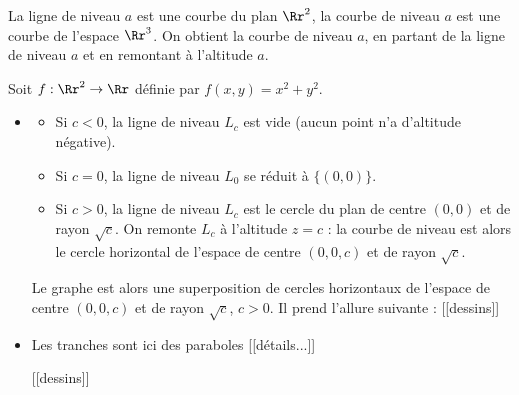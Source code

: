 \documentclass[12pt, class=report,crop=false]{standalone}
\begin{document}
La ligne de niveau $a$ est une courbe du plan $\Rr^2$, la courbe de niveau $a$
est une courbe de l'espace $\Rr^3$. On obtient la courbe de niveau $a$, en partant de la ligne de niveau $a$ et en remontant à l'altitude $a$.

\begin{exemple}
Soit $f : \Rr^2 \to \Rr$ définie par $f(x,y)=x^2+y^2$. 

\begin{itemize}
  \item
  \begin{itemize}
    \item Si $c<0$, la ligne de niveau $L_c$ est vide (aucun point n'a d'altitude négative).
    \item Si $c=0$, la ligne de niveau $L_0$ se réduit à $\{(0,0)\}$.
    \item Si $c>0$, la ligne de niveau $L_c$  est le cercle du plan de centre $(0,0)$ et de rayon $\sqrt{c}$. On remonte $L_c$ à l'altitude $z=c$ : la courbe de niveau est alors le cercle horizontal de l'espace de centre $(0,0,c)$ et de rayon $\sqrt{c}$. 
  \end{itemize}
      
Le graphe est alors une superposition de cercles horizontaux de l'espace de centre $(0,0,c)$ et de rayon $\sqrt{c}$, $c>0$.     
Il prend l'allure suivante :
[[dessins]]

  \item Les tranches sont ici des paraboles [[détails...]]
  
[[dessins]]  

\end{itemize}
\end{exemple}
\end{document}
